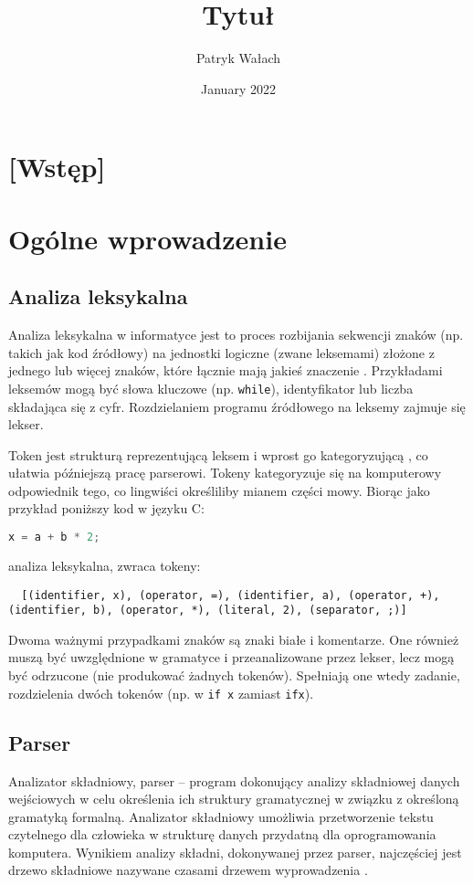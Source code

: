 \documentclass{article}
\title{Tytuł}
\author{Patryk Wałach}
\date{January 2022}
\begin{document}
\maketitle
\tableofcontents

\section*{[Wstęp]}

\section{Ogólne wprowadzenie}
\subsection{Analiza leksykalna}
Analiza leksykalna w informatyce jest to proces rozbijania sekwencji znaków (np. takich jak kod źródłowy) na jednostki logiczne (zwane leksemami) złożone z jednego lub więcej znaków, które łącznie mają jakieś znaczenie \cite{Hopcroft__Motwani__Ullman__2005}. Przykładami leksemów mogą być słowa kluczowe (np. \lstinline$while$), identyfikator lub liczba składająca się z cyfr. Rozdzielaniem programu źródłowego na leksemy zajmuje się lekser.

Token jest strukturą reprezentującą leksem i wprost go kategoryzującą \cite{ Aho__Sethi__Ullman__1985}, co ułatwia późniejszą pracę parserowi. Tokeny kategoryzuje się na komputerowy odpowiednik tego, co lingwiści określiliby mianem części mowy. Biorąc jako przykład poniższy kod w języku C:
\begin{lstlisting}[language=c]
  x = a + b * 2;
\end{lstlisting}
analiza leksykalna, zwraca tokeny:
\begin{lstlisting}
  [(identifier, x), (operator, =), (identifier, a), (operator, +), (identifier, b), (operator, *), (literal, 2), (separator, ;)]
\end{lstlisting}
Dwoma ważnymi przypadkami znaków są znaki białe i komentarze. One również muszą być uwzględnione w gramatyce i przeanalizowane przez lekser, lecz mogą być odrzucone (nie produkować żadnych tokenów). Spełniają one wtedy zadanie, rozdzielenia dwóch tokenów (np. w \lstinline{if x} zamiast \lstinline{ifx}).

\subsection{Parser}
Analizator składniowy, parser – program dokonujący analizy składniowej danych wejściowych w celu określenia ich struktury gramatycznej w związku z określoną gramatyką formalną. Analizator składniowy umożliwia przetworzenie tekstu czytelnego dla człowieka w strukturę danych przydatną dla oprogramowania komputera. Wynikiem analizy składni, dokonywanej przez parser, najczęściej jest drzewo składniowe nazywane czasami drzewem wyprowadzenia \cite{Aho__Sethi__Ullman__1985}.
\end{document}
